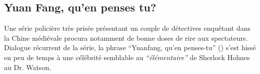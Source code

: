 \clearpage

\subsection{Yuan Fang, qu'en penses tu?}

Une série policière très prisée présentant un couple de détectives enquêtant dans la Chine médiévale procura notamment de bonne doses de rire aux spectateurs. Dialogue récurrent de la série, la phrase ``Yuanfang, qu'en penses-tu'' () s'est hissé en peu de temps à une célébrité semblable au \textit{``élémentaire''} de Sherlock Holmes au Dr. Watson. 

\begin{figure}[ht]
    \centering
    \newline

\end{figure}
